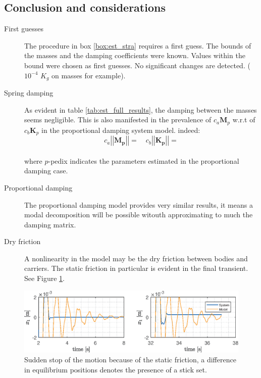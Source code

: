 \documentclass[twosided,a4paper]{article}           %
\newcommand{\norm}[1]{\left \lvert \left \lvert #1 \right \rvert \right  \rvert}
\newcommand{\rs}[1]{}
\newcounter{box}
\begin{document}
\subsection{Conclusion and considerations}
\begin{description}
	\item[First guesses] The procedure in box \ref{box:est_stra} requires a first guess. The bounds of the masses and the damping coefficients were known. Values within the bound were chosen as first guesses. No significant changes are detected. ($10^{-4}$ $K_g$ on masses for example).
	\item[Spring damping] As evident in table \ref{tab:est_full_results}, the damping between the masses seems negligible. This is also manifested in the prevalence of $c_a\bm{M}_p$ w.r.t of $c_b\bm{K}_p$ in the proportional damping system model. indeed:
	\begin{equation}
	c_a	\norm{\bm{M_p}} = \rs{c_a_m} \quad c_b	\norm{\bm{K_p}} = \rs{c_b_k}
	\end{equation} \\%
	where $p$-pedix indicates the parameters estimated in the proportional damping case.
	\item[Proportional damping] The proportional damping model provides very similar results, it means a modal decomposition will be possible witouth approximating to much the damping matrix.
	\item[Dry friction] A nonlinearity in the model may be the dry friction between bodies and carriers. The static friction in particular is evident in the final transient. See Figure \ref{fig:dryfric}.
\end{description}
\begin{figure}[H]
	\centering
	\includegraphics[width=.8\linewidth]{img/dry_fric}
	\caption{Sudden stop of the motion because of the static friction, a difference in equilibrium positions denotes the presence of a stick set.}
	\label{fig:dryfric}
\end{figure}
\end{document}
